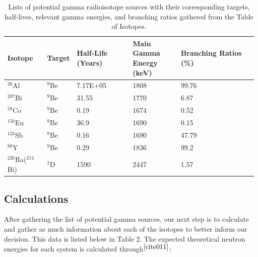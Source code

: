 \documentclass[%
12pt,
twoside,
reprint,
amsmath,amssymb,
aps,
]{article}
\begin{document}
	\begin{table}[H]
		\begin{center}
		\scriptsize
		\begin{tabular}{l l l l l l}
			\hline
			\textbf{Isotope} & \textbf{Target} & \textbf{Half-Life (Years)} & \makecell{\textbf{Main Gamma} \\ \textbf{Energy (keV)}} & \textbf{Branching Ratios (\%)} \\ \hline
			$^{26}$Al            & $^{9}$Be           & 7.17E+05                   & 1808                             & 99.76                          \\ \hline
			$^{207}$Bi           & $^{9}$Be          & 31.55                      & 1770                             & 6.87                           \\ \hline
			$^{58}$Co            & $^{9}$Be            & 0.19                       & 1674                             & 0.52                           \\ \hline
			$^{150}$Eu           & $^{9}$Be           & 36.9                       & 1690                             & 0.15                           \\ \hline
			$^{124}$Sb           & $^{9}$Be           & 0.16                       & 1690                             & 47.79                          \\ \hline
			$^{88}$Y             & $^{9}$Be            & 0.29                       & 1836                             & 99.2                           \\ \hline
			$^{226}$Ra($^{214}$Bi)       & $^{2}$D              & 1590                       & 2447                             & 1.57                           \\ \hline
		\end{tabular}
		\caption{\label{tab:table-name} Lists of potential gamma radioisotope sources with their corresponding targets, half-lives, relevant gamma energies, and branching ratios gathered from the Table of Isotopes.}
	\end{center}
	\end{table}
		
	\subsection{Calculations}
	\par After gathering the list of potential gamma sources, our next step is to calculate and gather as much information about each of the isotopes to better inform our decision. This data is listed below in Table 2. The expected theoretical neutron energies for each system is calculated through$^{\cite{cite011}}$:
	
\end{document}

